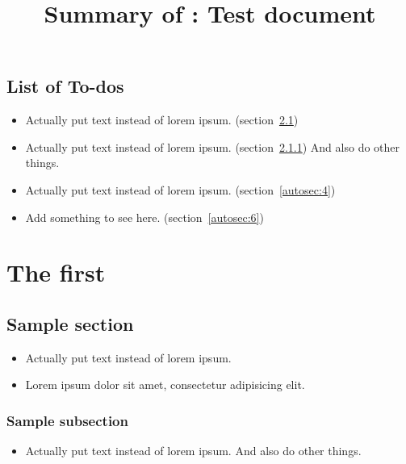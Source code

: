 \title{Summary of : Test document}
\maketitle

\section{List of To-dos}
    \begin{itemize}[noitemsep]
        \item {\color{red}Actually put text instead of lorem ipsum.} (section~\ref{autosec:2})
        \item {\color{red}Actually put text instead of lorem ipsum.} (section~\ref{autosec:3})
{\color{red}And also do other things.}
        \item {\color{red}Actually put text instead of lorem ipsum.} (section~\ref{autosec:4})
        \item {\color{red}Add something to see here.} (section~\ref{autosec:6})
    \end{itemize}

\chapter{The first}
\label{autosec:1}
\vspace{-36pt}\hspace{11pt}
\section{Sample section}
\label{autosec:2}
    \begin{itemize}[noitemsep]
        \item {\color{red}Actually put text instead of lorem ipsum.}
        \item Lorem ipsum dolor sit amet, consectetur adipisicing elit.
    \end{itemize}
\subsection{Sample subsection}
\label{autosec:3}
    \begin{itemize}[noitemsep]
        \item {\color{red}Actually put text instead of lorem ipsum.}
{\color{red}And also do other things.}
    \end{itemize}

